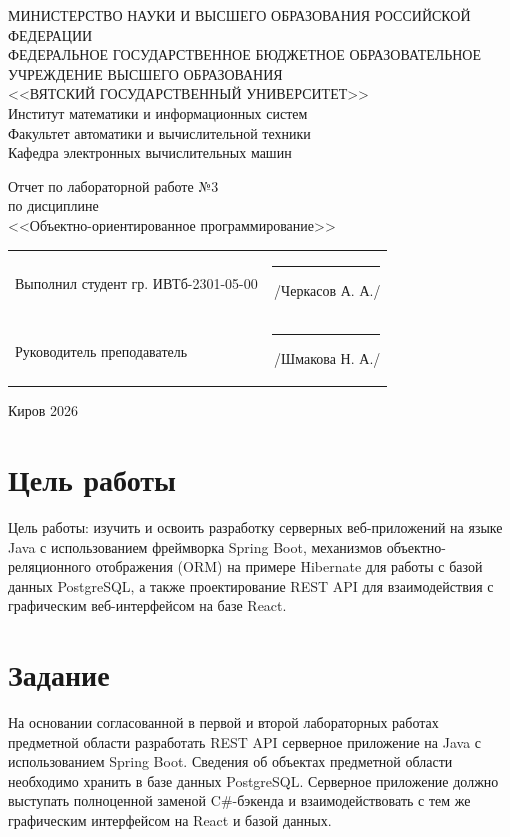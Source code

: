 \documentclass[oneside,a4paper,14pt]{extarticle}
\begin{document}
\newpage\thispagestyle{empty}
\begin{center}
  \MakeUppercase{
    Министерство науки и высшего образования Российской Федерации\\
    Федеральное государственное бюджетное образовательное учреждение высшего образования\\
    <<Вятский Государственный Университет>>\\
  }
  Институт математики и информационных систем\\
  Факультет автоматики и вычислительной техники\\
  Кафедра электронных вычислительных машин
\end{center}
\vfill

\begin{center}
  Отчет по лабораторной работе №3\\
  по дисциплине\\
  <<Объектно-ориентированное программирование>>\\
\end{center}
\vfill

\noindent
\begin{tabular}{ll}
  Выполнил студент гр. ИВТб-2301-05-00 \hspace{5mm} & \rule[-1mm]{25mm}{0.10mm}\,/Черкасов А. А./ \\
  Руководитель преподаватель                        & \rule[-1mm]{25mm}{0.10mm}\,/Шмакова Н. А./ \\
\end{tabular}

\vfill
\begin{center}
  Киров 2026
\end{center}

\newpage
\section*{\hspace{12.5mm}Цель работы}
Цель работы: изучить и освоить разработку серверных веб-приложений на языке Java с использованием фреймворка Spring Boot, механизмов объектно-реляционного отображения (ORM) на примере Hibernate для работы с базой данных PostgreSQL, а также проектирование REST API для взаимодействия с графическим веб-интерфейсом на базе React.

\section*{\hspace{12.5mm}Задание}
На основании согласованной в первой и второй лабораторных работах предметной области разработать REST API серверное приложение на Java с использованием Spring Boot. Сведения об объектах предметной области необходимо хранить в базе данных PostgreSQL. Серверное приложение должно выступать полноценной заменой C\#-бэкенда и взаимодействовать с тем же графическим интерфейсом на React и базой данных.
\end{document}
